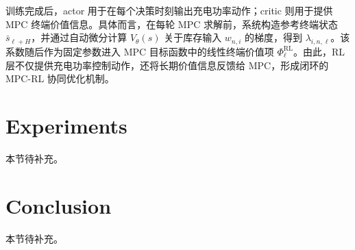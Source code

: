 \documentclass[12pt,hyperref,a4paper,UTF8]{ctexart}
\begin{document}
训练完成后，actor 用于在每个决策时刻输出充电功率动作；critic 则用于提供 MPC 终端价值信息。具体而言，在每轮 MPC 求解前，系统构造参考终端状态 $\bar{s}_{\ell+H}$，并通过自动微分计算 $V_{\theta}(s)$ 关于库存输入 $w_{n,i}$ 的梯度，得到 $\lambda_{i,n,\ell}$。该系数随后作为固定参数进入 MPC 目标函数中的线性终端价值项 $\Phi_{\ell}^{\mathrm{RL}}$。由此，RL 层不仅提供充电功率控制动作，还将长期价值信息反馈给 MPC，形成闭环的 MPC-RL 协同优化机制。

\section{Experiments}

本节待补充。

\section{Conclusion}

本节待补充。


\end{document}
